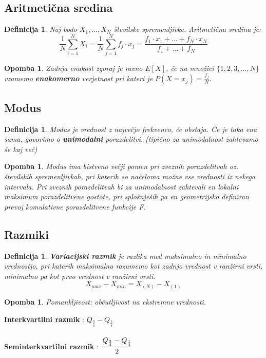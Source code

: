 \documentclass[11pt]{article}
\newtheorem{Definicija}[Izrek]{{\sc Definicija}}
\newtheorem{Opomba}[Izrek]{{\sc Opomba}}
\begin{document}
\subsection{Aritmetična sredina}
\begin{Definicija}
	Naj bodo $X_1, \ldots ,X_N$ številske spremenljivke. Aritmetična sredina je:
	$$\frac{1}{N}\sum_{i = 1}^{N}X_i = \frac{1}{N}\sum_{j = 1}^{N}{f_j \cdot x_j} = \frac{f_1 \cdot x_1 + \ldots + f_N\cdot x_N}{f_1 + \ldots + f_N}$$
\end{Definicija}
\begin{Opomba}
	Zadnja enakost zgoraj je ravno $E[X]$, če na množici $\{1,2,3,\ldots, N \}$ vzamemo \textbf{enakomerno} verjetnost pri kateri je $P(X = x_j) = \frac{f_j}{N}$.
\end{Opomba}
\subsection{Modus}
\begin{Definicija}
	Modus je vrednost z največjo frekvenco, če obstaja. Če je taka ena sama, govorimo o \textbf{unimodalni} porazdelitvi. (tipično za unimodalnost zahtevamo še kaj več)
\end{Definicija}
\begin{Opomba}
	Modus ima bistveno večji pomen pri zveznih porazdelitvah oz. številskih spremenljivkah, pri katerih so načeloma možne vse vrednosti iz nekega intervala. Pri zveznih porazdelitvah bi za unimodalnost zahtevali en lokalni maksimum porazdelitvene gostote, pri splošnješih pa en geometrijsko definiran prevoj komulativne porazdelitvene funkcije F.
\end{Opomba}
\subsection{Razmiki}
\begin{Definicija}
	\textbf{Variacijski razmik} je razlika med maksimalno in minimalno vrednostjo, pri katerih maksimalno razumemo kot zadnjo vrednost v ranžirni vrsti, minimalno pa kot prvo vrednost v ranžirni vrsti.
	$$ X_{max} - X_{min} = X_(N) - X_(1)$$
\end{Definicija}
\begin{Opomba}
	Pomankljivost: občutljivost na ekstremne vrednosti.
\end{Opomba}
	\textbf{Interkvartilni razmik} : $Q_{\frac{3}{4}} - Q_{\frac{1}{4}}$
	\\
	\\
	\textbf{Seminterkvartilni razmik} : $\cfrac{Q_{\frac{3}{4}} - Q_{\frac{1}{4}}}{2}$
\end{document}
